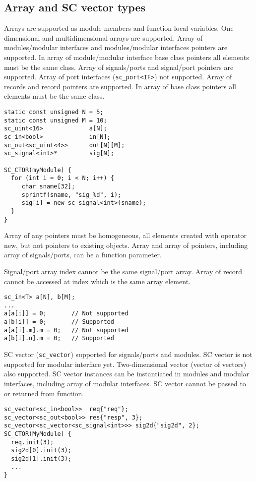 \subsection{Array and SC vector types}

Arrays are supported as module members and function local variables. One-dimensional and multidimensional arrays are supported. Array of modules/modular interfaces and modules/modular interfaces pointers are supported.  In array of module/modular interface base class pointers all elements must be the same class. Array of signals/ports and signal/port pointers are supported. Array of port interfaces ({\tt sc\_port<IF>}) not supported. Array of records and record pointers are supported. In array of base class pointers all elements must be the same class.
%
\begin{lstlisting}[style=mycpp]
static const unsigned N = 5;   
static const unsigned M = 10;   
sc_uint<16>  		    a[N];
sc_in<bool>             in[N];
sc_out<sc_uint<4>>      out[N][M];
sc_signal<int>*     	sig[N];

SC_CTOR(myModule) {
  for (int i = 0; i < N; i++) {
     char sname[32];
     sprintf(sname, "sig_%d", i); 
     sig[i] = new sc_signal<int>(sname);
  }   
}
\end{lstlisting}

Array of any pointers must be homogeneous, all elements created with operator new, but not pointers to existing objects. 
Array and array of pointers, including array of signals/ports, can be a function parameter. 
 
Signal/port array index cannot be the same signal/port array. Array of record cannot be accessed at index which is the same array element.
%
\begin{lstlisting}[style=mycpp]
sc_in<T> a[N], b[M]; 
...
a[a[i]] = 0;       // Not supported 
a[b[i]] = 0;       // Supported
a[a[i].m].m = 0;   // Not supported 
a[b[i].n].m = 0;   // Supported
\end{lstlisting}

SC vector ({\tt sc\_vector}) supported for signals/ports and modules. SC vector is not supported for modular interface yet. Two-dimensional vector (vector of vectors) also supported. SC vector instances can be instantiated in modules and modular interfaces, including array of modular interfaces. SC vector cannot be passed to or returned from function.
%
\begin{lstlisting}[style=mycpp]
sc_vector<sc_in<bool>>  req{"req"};
sc_vector<sc_out<bool>> res{"resp", 3};
sc_vector<sc_vector<sc_signal<int>>> sig2d{"sig2d", 2};
SC_CTOR(MyModule) {
  req.init(3);
  sig2d[0].init(3);
  sig2d[1].init(3);        
  ...
}
\end{lstlisting}



